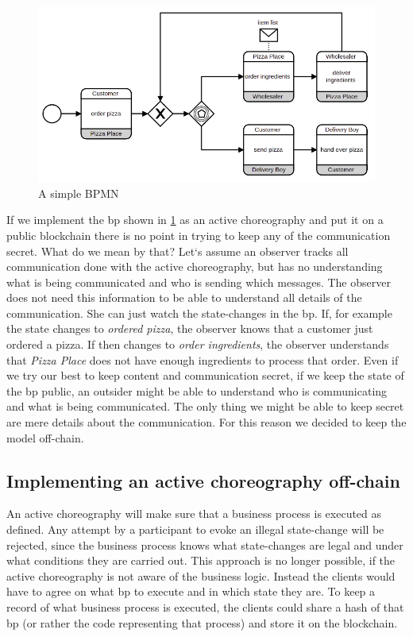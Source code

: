 \documentclass[runningheads]{llncs}
\begin{document}
\begin{figure}
    \centering
    \includegraphics[scale=0.6]{bpmn.png}
    \caption{A simple BPMN}
    \label{fig:bpmn}
\end{figure}

If we implement the bp shown in \ref{fig:bpmn} as an active choreography and put it on a public blockchain there is no point in trying to keep any of the communication secret. What do we mean by that? Let`s assume an observer tracks all communication done with the active choreography, but has no understanding what is being communicated and who is sending which messages. The observer does not need this information to be able to understand all details of the communication. She can just watch the state-changes in the bp. If, for example the state changes to \textit{ordered pizza}, the observer knows that a customer just ordered a pizza. If then changes to \textit{order ingredients}, the observer understands that \textit{Pizza Place} does not have enough ingredients to process that order. Even if we try our best to keep content and communication secret, if we keep the state of the bp public, an outsider might be able to understand who is communicating and what is being communicated. The only thing we might be able to keep secret are mere details about the communication. For this reason we decided to keep the model off-chain. 


\subsection{Implementing an active choreography off-chain}

An active choreography will make sure that a business process is executed as defined. Any attempt by a participant to evoke an illegal state-change will be rejected, since the business process knows what state-changes are legal and under what conditions they are carried out. This approach is no longer possible, if the active choreography is not aware of the business logic. Instead the clients would have to agree on what bp to execute and in which state they are. To keep a record of what business process is executed, the clients could share a hash of that bp (or rather the code representing that process) and store it on the blockchain. 
\end{document}
